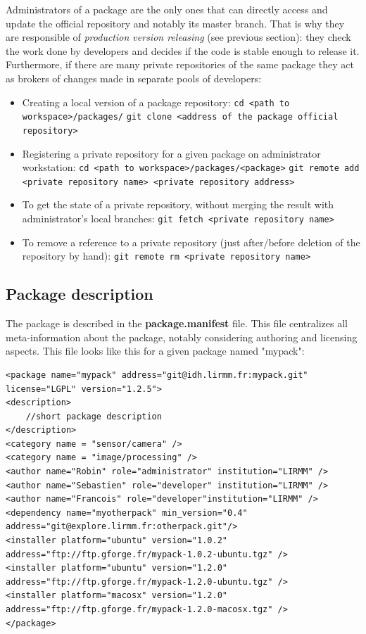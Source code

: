 \documentclass[12pt,a4paper]{article}
\begin{document}
Administrators of a package are the only ones that can directly access and update the official repository and notably its master branch. That is why they are responsible of \textit{production version releasing} (see previous section): they check the work done by developers and decides if the code is stable enough to release it. Furthermore, if there are many private repositories of the same package they act as brokers of changes made in separate pools of developers:
\begin{itemize}
\item Creating a local version of a package repository:
\linebreak \texttt{cd <path to workspace>/packages/}
\linebreak \texttt{git clone <address of the package official repository>}
\item Registering a private repository for a given package on administrator workstation:
\linebreak \texttt{cd <path to workspace>/packages/<package>}
\linebreak \texttt{git remote add <private repository name> <private repository address>}
\item To get the state of a private repository, without merging the result with administrator's local branches:
\linebreak \texttt{git fetch <private repository name>}
\item To remove a reference to a private repository (just after/before deletion of the repository by hand):
\linebreak \texttt{git remote rm <private repository name>}
\end{itemize}

\subsection{Package description}

The package is described in the \textbf{package.manifest} file. This file centralizes all meta-information about the package, notably considering authoring and licensing aspects. This file looks like this for a given package named "mypack":
\begin{verbatim}
<package name="mypack" address="git@idh.lirmm.fr:mypack.git"
license="LGPL" version="1.2.5">
<description>
	//short package description
</description>
<category name = "sensor/camera" />
<category name = "image/processing" />
<author name="Robin" role="administrator" institution="LIRMM" />
<author name="Sebastien" role="developer" institution="LIRMM" />    
<author name="Francois" role="developer"institution="LIRMM" />
<dependency name="myotherpack" min_version="0.4"
address="git@explore.lirmm.fr:otherpack.git"/>
<installer platform="ubuntu" version="1.0.2"
address="ftp://ftp.gforge.fr/mypack-1.0.2-ubuntu.tgz" />
<installer platform="ubuntu" version="1.2.0" 
address="ftp://ftp.gforge.fr/mypack-1.2.0-ubuntu.tgz" />
<installer platform="macosx" version="1.2.0" 
address="ftp://ftp.gforge.fr/mypack-1.2.0-macosx.tgz" />
</package>
\end{verbatim}
\end{document}
